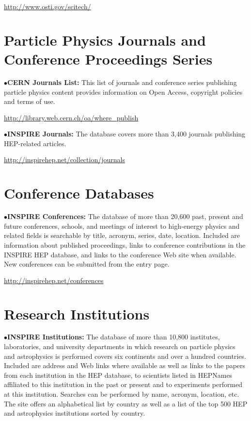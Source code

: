    \item{}\qquad\url{http://www.osti.gov/scitech/}
\medskip

\vglue -0.1in
\section{Particle Physics Journals and Conference Proceedings Series}%

\item{$\bullet$}{\bf CERN Journals List:} 
This list of journals and conference series publishing particle physics content provides information on Open Access, copyright policies and terms of use.

   \item{}\qquad\url{http://library.web.cern.ch/oa/where\_publish} 
\medskip

\item{$\bullet$}{\bf INSPIRE Journals:} 
The database covers more than 3,400 journals publishing HEP-related articles.

   \item{}\qquad\url{http://inspirehep.net/collection/journals}
\medskip


\section{Conference Databases}%

\item{$\bullet$}{\bf INSPIRE Conferences:} 
The database of more than 20,600 past, present and future conferences, schools, and meetings of interest to high-energy physics and related fields is searchable by title, acronym, series, date, location. Included are information about published proceedings, links to conference contributions in the INSPIRE HEP database, and links to the conference Web site when available. New conferences can be submitted from the entry page.
	\item{}\qquad\url{http://inspirehep.net/conferences}
\medskip


\section{Research Institutions}%

\item{$\bullet$}{\bf INSPIRE Institutions:} 
The database of more than 10,800 institutes, laboratories, and university departments in which research on particle physics and astrophysics is performed covers six continents and over a hundred countries. Included are address and Web links where available as well as links to the papers from each institution in the HEP database, to scientists listed in HEPNames affiliated to this institution in the past or present and to experiments performed at this institution. Searches can be performed by name, acronym, location, etc. The site offers an alphabetical list by country as well as a list of the top 500 HEP and astrophysics institutions sorted by country.

